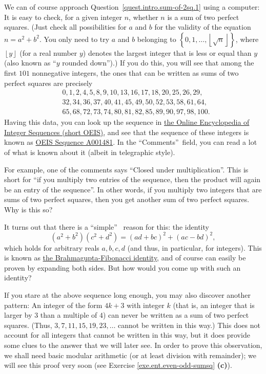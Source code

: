 \documentclass[numbers=enddot,12pt,final,onecolumn,notitlepage]{scrartcl}%
\numberwithin{exer}{subsection}
\theoremstyle{definition}
\begin{document}
We can of course approach Question~\ref{quest.intro.sum-of-2sq.1} using a
computer: It is easy to check, for a given integer $n$, whether $n$ is a sum
of two perfect squares. (Just check all possibilities for $a$ and $b$ for the
validity of the equation $n=a^{2}+b^{2}$. You only need to try $a$ and $b$
belonging to $\left\{  0,1,\ldots,\left\lfloor \sqrt{n}\right\rfloor \right\}
$, where $\left\lfloor y\right\rfloor $ (for a real number $y$) denotes the
largest integer that is less or equal than $y$ (also known as
\textquotedblleft$y$ rounded down\textquotedblright).) If you do this, you
will see that among the first $101$ nonnegative integers, the ones that can be
written as sums of two perfect squares are precisely
\begin{align*}
&  0,1,2,4,5,8,9,10,13,16,17,18,20,25,26,29,\\
&  32,34,36,37,40,41,45,49,50,52,53,58,61,64,\\
&  65,68,72,73,74,80,81,82,85,89,90,97,98,100.
\end{align*}
Having this data, you can look up the sequence in \href{https://oeis.org/}{the
Online Encyclopedia of Integer Sequences (short OEIS)}, and see that the
sequence of these integers is known as \href{https://oeis.org/A001481}{OEIS
Sequence A001481}. In the \textquotedblleft Comments\textquotedblright\ field,
you can read a lot of what is known about it (albeit in telegraphic style).

For example, one of the comments says ``Closed under multiplication''. This is
short for ``if you multiply two entries of the sequence, then the product will
again be an entry of the sequence''. In other words, if you multiply two
integers that are sums of two perfect squares, then you get another sum of two
perfect squares. Why is this so?

It turns out that there is a \textquotedblleft simple\textquotedblright%
\ reason for this: the identity
\begin{equation}
\left(  a^{2}+b^{2}\right)  \left(  c^{2}+d^{2}\right)  =\left(  ad+bc\right)
^{2}+\left(  ac-bd\right)  ^{2}, \label{eq.intro.sum-of-2sq.sum*sum}%
\end{equation}
which holds for arbitrary reals $a,b,c,d$ (and thus, in particular, for
integers). This is known as
\href{https://en.wikipedia.org/wiki/Brahmagupta-Fibonacci_identity}{the
Brahmagupta-Fibonacci identity}, and of course can easily be proven by
expanding both sides. But how would you come up with such an identity?

If you stare at the above sequence long enough, you may also discover another
pattern: An integer of the form $4k+3$ with integer $k$ (that is, an integer
that is larger by $3$ than a multiple of $4$) can never be written as a sum of
two perfect squares. (Thus, $3,7,11,15,19,23,\ldots$ cannot be written in this
way.) This does not account for all integers that cannot be written in this
way, but it does provide some clues to the answer that we will later see. In
order to prove this observation, we shall need basic modular arithmetic (or at
least division with remainder); we will see this proof very soon (see Exercise
\ref{exe.ent.even-odd-sumsq} \textbf{(c)}).
\end{document}
